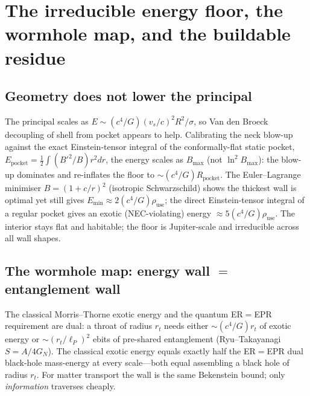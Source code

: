 \documentclass[11pt,a4paper]{article}
\begin{document}
\section{The irreducible energy floor, the wormhole map, and the buildable residue}\label{sec:floor}

\subsection{Geometry does not lower the principal}
The principal scales as $E\sim(c^{4}/G)(v_{s}/c)^{2}R^{2}/\sigma$, so Van den Broeck~\cite{VanDenBroeck1999} decoupling of shell from pocket appears to help. Calibrating the neck blow-up against the exact Einstein-tensor integral of the conformally-flat static pocket, $E_{\mathrm{pocket}}=\tfrac12\!\int(B'^{2}/B)r^{2}dr$, the energy scales as $B_{\max}$ (not $\ln^{2}B_{\max}$): the blow-up dominates and re-inflates the floor to $\sim(c^{4}/G)R_{\mathrm{pocket}}$. The Euler--Lagrange minimiser $B=(1+c/r)^{2}$ (isotropic Schwarzschild) shows the thickest wall is optimal yet still gives $E_{\min}\approx2(c^{4}/G)\rho_{\mathrm{use}}$; the direct Einstein-tensor integral of a regular pocket gives an exotic (NEC-violating) energy $\approx5(c^{4}/G)\rho_{\mathrm{use}}$. The interior stays flat and habitable; the floor is Jupiter-scale and irreducible across all wall shapes.

\subsection{The wormhole map: energy wall $=$ entanglement wall}
The classical Morris--Thorne exotic energy and the quantum ER$=$EPR~\cite{MaldacenaSusskind2013} requirement are dual: a throat of radius $r_{t}$ needs either $\sim(c^{4}/G)r_{t}$ of exotic energy or $\sim(r_{t}/\ell_{P})^{2}$ ebits of pre-shared entanglement (Ryu--Takayanagi $S=A/4G_{N}$). The classical exotic energy equals exactly half the ER$=$EPR dual black-hole mass-energy at every scale---both equal assembling a black hole of radius $r_{t}$. For matter transport the wall is the same Bekenstein bound; only \emph{information} traverses cheaply.
\end{document}
